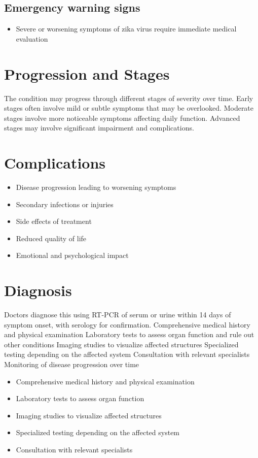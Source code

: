 \subsection{Emergency warning signs}
\begin{itemize}[noitemsep]
  \item Severe or worsening symptoms of zika virus require immediate medical evaluation
\end{itemize}
\section{Progression and Stages}
The condition may progress through different stages of severity over time. Early stages often involve mild or subtle symptoms that may be overlooked. Moderate stages involve more noticeable symptoms affecting daily function. Advanced stages may involve significant impairment and complications.
\section{Complications}
\begin{itemize}[noitemsep]
  \item Disease progression leading to worsening symptoms
  \item Secondary infections or injuries
  \item Side effects of treatment
  \item Reduced quality of life
  \item Emotional and psychological impact
\end{itemize}
\section{Diagnosis}
Doctors diagnose this using RT-PCR of serum or urine within 14 days of symptom onset, with serology for confirmation. Comprehensive medical history and physical examination Laboratory tests to assess organ function and rule out other conditions Imaging studies to visualize affected structures Specialized testing depending on the affected system Consultation with relevant specialists Monitoring of disease progression over time

\begin{itemize}[noitemsep]
  \item Comprehensive medical history and physical examination
  \item Laboratory tests to assess organ function
  \item Imaging studies to visualize affected structures
  \item Specialized testing depending on the affected system
  \item Consultation with relevant specialists
\end{itemize}
